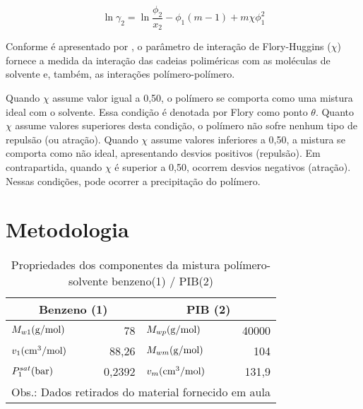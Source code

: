 \begin{equation}
\ln\gamma_2 = \ln\frac{\phi_2}{x_2} - \phi_1\left( m - 1 \right) +
m\chi\phi_1^2
\end{equation}



Conforme é apresentado por , o parâmetro de interação de
Flory-Huggins ($\chi$) fornece a medida da interação das cadeias poliméricas com as moléculas de solvente e, também, as interações
polímero-polímero. 

Quando $\chi$ assume valor igual a 0,50, o polímero se comporta
como uma mistura ideal com o solvente. Essa condição é denotada por Flory como ponto
$\theta$. Quanto $\chi$ assume valores superiores desta condição, o polímero não
sofre nenhum tipo de repulsão (ou atração). Quando $\chi$ assume valores
inferiores a 0,50, a mistura se comporta como não ideal, apresentando desvios
positivos (repulsão). Em contrapartida, quando $\chi$ é superior a 0,50, ocorrem
desvios negativos (atração). Nessas condições, pode ocorrer a precipitação do
polímero.


\section{Metodologia}

\begin{table}[htb]
\renewcommand{\arraystretch}{1.3}
\caption{Propriedades dos componentes da mistura polímero-solvente benzeno(1) /
PIB(2)}
\footnotesize
\center
\begin{tabular}{lr|lr}
\toprule
\multicolumn{2}{c}{Benzeno (1)}	&	\multicolumn{2}{c}{PIB (2)}		\\
\midrule 
{$M_{w1}\rm{ (g/mol)}$} 	&	{78}	&	{$M_{wp}\rm{ (g/mol)}$}	&	{40000}	\\
{$v_1\rm{ (cm^3/mol)}$}	&	{88,26}	&	{$M_{wm} \rm{ (g/mol)}$}	&	{104}	\\
{$P_1^{sat}\rm{ (bar)}$}	&	{0,2392}	&	{$v_m \rm{ (cm^3/mol)}$}	&	{131,9}	\\

\bottomrule
\multicolumn{4}{c}{Obs.: Dados retirados do material fornecido em aula}
\end{tabular}
\label{tab:dexp1}
\end{table}

